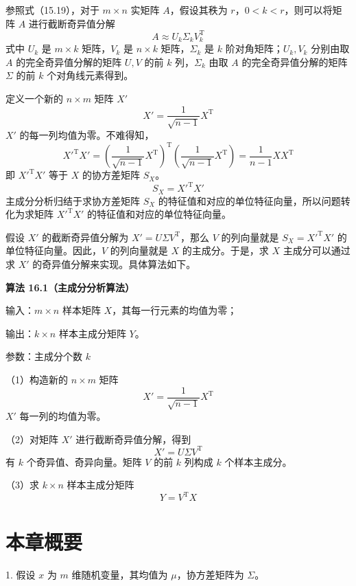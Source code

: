 \documentclass[UTF8, 12pt, fontset=fandol, oneside]{ctexart}
\begin{document}
参照式（15.19），对于 $m\times n$ 实矩阵 $A$，假设其秩为 $r$，$0<k<r$，则可以将矩阵 $A$ 进行截断奇异值分解
\[
A\approx U_k\Sigma_kV_k^{\mathrm{T}}
\]
式中 $U_k$ 是 $m\times k$ 矩阵，$V_k$ 是 $n\times k$ 矩阵，$\Sigma_k$ 是 $k$ 阶对角矩阵；$U_k,V_k$ 分别由取 $A$ 的完全奇异值分解的矩阵 $U,V$ 的前 $k$ 列，$\Sigma_k$ 由取 $A$ 的完全奇异值分解的矩阵 $\Sigma$ 的前 $k$ 个对角线元素得到。

定义一个新的 $n\times m$ 矩阵 $X'$
\begin{equation}
X'=\frac{1}{\sqrt{n-1}}X^{\mathrm{T}}
\tag{16.51}
\end{equation}
$X'$ 的每一列均值为零。不难得知，
\begin{equation}
X'^{\mathrm{T}}X'=
\left(\frac{1}{\sqrt{n-1}}X^{\mathrm{T}}\right)^{\mathrm{T}}
\left(\frac{1}{\sqrt{n-1}}X^{\mathrm{T}}\right)
=\frac{1}{n-1}XX^{\mathrm{T}}
\tag{16.52}
\end{equation}
即 $X'^{\mathrm{T}}X'$ 等于 $X$ 的协方差矩阵 $S_X$。
\begin{equation}
S_X=X'^{\mathrm{T}}X'
\tag{16.53}
\end{equation}
主成分分析归结于求协方差矩阵 $S_X$ 的特征值和对应的单位特征向量，所以问题转化为求矩阵 $X'^{\mathrm{T}}X'$ 的特征值和对应的单位特征向量。

假设 $X'$ 的截断奇异值分解为 $X'=U\Sigma V^{\mathrm{T}}$，那么 $V$ 的列向量就是 $S_X=X'^{\mathrm{T}}X'$ 的单位特征向量。因此，$V$ 的列向量就是 $X$ 的主成分。于是，求 $X$ 主成分可以通过求 $X'$ 的奇异值分解来实现。具体算法如下。

\noindent\textbf{算法 16.1（主成分分析算法）}

输入：$m\times n$ 样本矩阵 $X$，其每一行元素的均值为零；

输出：$k\times n$ 样本主成分矩阵 $Y$。

参数：主成分个数 $k$

（1）构造新的 $n\times m$ 矩阵
\[
X'=\frac{1}{\sqrt{n-1}}X^{\mathrm{T}}
\]
$X'$ 每一列的均值为零。

（2）对矩阵 $X'$ 进行截断奇异值分解，得到
\[
X'=U\Sigma V^{\mathrm{T}}
\]
有 $k$ 个奇异值、奇异向量。矩阵 $V$ 的前 $k$ 列构成 $k$ 个样本主成分。

（3）求 $k\times n$ 样本主成分矩阵
\[
Y=V^{\mathrm{T}}X
\]

\section*{本章概要}

1. 假设 $x$ 为 $m$ 维随机变量，其均值为 $\mu$，协方差矩阵为 $\Sigma$。
\end{document}
